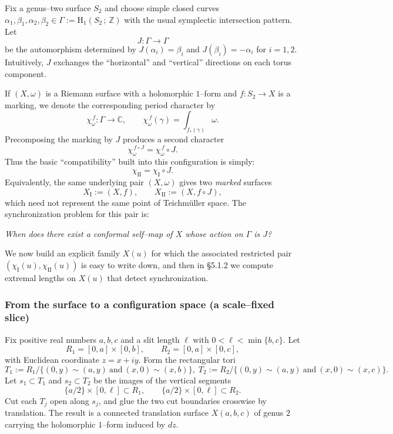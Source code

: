 \documentclass[a4paper,12pt]{amsart}
\newcommand{\C}{\mathbb{C}}
\newcommand{\Z}{\mathbb{Z}}
\theoremstyle{plain}
\theoremstyle{definition}
\begin{document}
\medskip

Fix a genus--two surface \(S_2\) and choose simple closed curves
\(\alpha_1,\beta_1,\alpha_2,\beta_2\in \Gamma:=\mathrm{H}_1(S_2\,;\,\Z)\)
with the usual symplectic intersection pattern.
Let
\[
J:\Gamma\longrightarrow \Gamma
\]
be the automorphism determined by
\(
J(\alpha_i)=\beta_i
\)
and
\(
J(\beta_i)=-\alpha_i
\)
for \(i=1,2\).
Intuitively, \(J\) exchanges the ``horizontal'' and ``vertical'' directions on each torus component.

\medskip

If \((X,\omega)\) is a Riemann surface with a holomorphic \(1\)--form and
\(f:S_2\to X\) is a marking, we denote the corresponding period character by
\[
\chi_{\omega}^{\,f}:\Gamma\longrightarrow \C,
\qquad
\chi_{\omega}^{\,f}(\gamma)=\int_{f_*(\gamma)}\omega.
\]
Precomposing the marking by \(J\) produces a second character
\[
\chi_{\omega}^{\,f\circ J}=\chi_{\omega}^{\,f}\circ J.
\]
Thus the basic ``compatibility'' built into this configuration is simply:
\[
\chi_{\mathrm{II}}=\chi_{\mathrm{I}}\circ J.
\]
Equivalently, the same underlying pair \((X,\omega)\) gives two \emph{marked} surfaces
\[
X_{\mathrm{I}}:=(X,f),
\qquad
X_{\mathrm{II}}:=(X,f\circ J),
\]
which need not represent the same point of Teichm\"uller space.
The synchronization problem for this pair is:

\begin{center}
\emph{When does there exist a conformal self--map of \(X\) whose action on \(\Gamma\) is \(J\)?}
\end{center}

\medskip 


We now build an explicit family \(X(u)\) for which the associated restricted pair
\((\chi_{\mathrm{I}}(u),\chi_{\mathrm{II}}(u))\) is easy to write down, and then in \S5.1.2 we compute
extremal lengths on \(X(u)\) that detect synchronization.

\subsubsection{From the surface to a configuration space (a scale--fixed slice)}

Fix positive real numbers \(a,b,c\) and a slit length \(\ell\) with \(0<\ell<\min\{b,c\}\).
Let
\[
R_1=[0,a]\times[0,b],
\qquad
R_2=[0,a]\times[0,c],\]
with Euclidean coordinate \(z=x+iy\).
Form the rectangular tori
\[
T_1:=R_1/\{(0,y)\sim(a,y)\ \text{and}\ (x,0)\sim(x,b)\},
\;
T_2:=R_2/\{(0,y)\sim(a,y)\ \text{and}\ (x,0)\sim(x,c)\}.
\]
Let \(s_1\subset T_1\) and \(s_2\subset T_2\) be the images of the vertical segments
\[
\{a/2\}\times[0,\ell]\subset R_1,
\qquad
\{a/2\}\times[0,\ell]\subset R_2.
\]
Cut each \(T_j\) open along \(s_j\), and glue the two cut boundaries crosswise by translation.
The result is a connected translation surface \(X(a,b,c)\) of genus \(2\) carrying the holomorphic
\(1\)--form induced by \(dz\).
\end{document}
